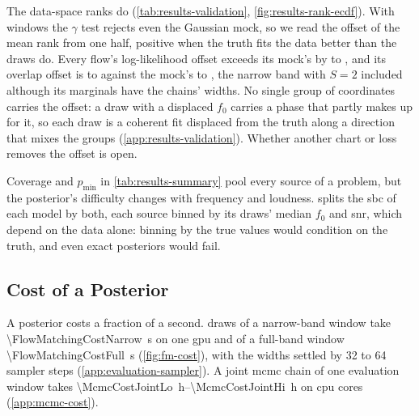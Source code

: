 The data-space ranks do (\cref{tab:results-validation}, \cref{fig:results-rank-ecdf}). With
\ResultsValidationInjections{} windows the $\gamma$ test \citep{sailynoja2022graphical} rejects even
the Gaussian mock, so we read the offset of the mean rank from one half, positive when the truth
fits the data better than the draws do. Every flow's log-likelihood offset exceeds its mock's by
\ResultsLikeExcessLo{} to \ResultsLikeExcessHi, and its overlap offset is \ResultsFlowOverlapOffsetLo{}
to \ResultsFlowOverlapOffsetHi{} against the mock's \ResultsMockOverlapOffsetLo{} to
\ResultsMockOverlapOffsetHi, the narrow band with $S=2$ included although its marginals have the
chains' widths. No single group of coordinates carries the offset: a draw with a displaced $f_0$
carries a phase that partly makes up for it, so each draw is a coherent fit displaced from the truth
along a direction that mixes the groups (\cref{app:results-validation}). Whether another chart or
loss removes the offset is open.

\label{sec:results-sbc-heatmap}
Coverage and $p_{\min}$ in \cref{tab:results-summary} pool every source of a problem, but the posterior's
difficulty changes with frequency and loudness.  splits the \acs{sbc} of each model by
both, each source binned by its draws' median $f_0$ and \acs{snr}, which depend on the data alone: binning by
the true values would condition on the truth, and even exact posteriors would fail. 
\subsection{Cost of a Posterior}
\label{sec:results-cost}

A posterior costs a fraction of a second. \FlowMatchingCostDraws{} draws of a narrow-band window take
\qty{\FlowMatchingCostNarrow}{\second} on one \ac{gpu} and of a full-band window
\qty{\FlowMatchingCostFull}{\second} (\cref{fig:fm-cost}), with the widths settled by 32 to 64
sampler steps (\cref{app:evaluation-sampler}). A joint \ac{mcmc} chain of one evaluation window takes
\qtyrange{\McmcCostJointLo}{\McmcCostJointHi}{\hour} on \McmcJointCores{} \ac{cpu} cores
(\cref{app:mcmc-cost}).


